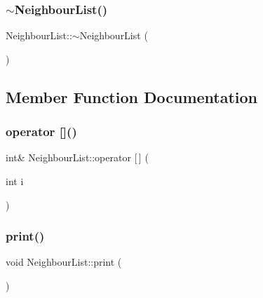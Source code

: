 \mbox{\label{struct_neighbour_list_afcdbcc7fde83d4ce3a4fecc8d4105cd8}} 
\subsubsection{\texorpdfstring{$\sim$NeighbourList()}{~NeighbourList()}}
{\footnotesize\ttfamily Neighbour\+List\+::$\sim$\+Neighbour\+List (\begin{DoxyParamCaption}{ }\end{DoxyParamCaption})}



\subsection{Member Function Documentation}
\mbox{\label{struct_neighbour_list_a9bd6ad04ef1eb6ad9737ac493b6864d1}} 
\subsubsection{\texorpdfstring{operator []()}{operator []()}}
{\footnotesize\ttfamily int\& Neighbour\+List\+::operator \mbox{[}$\,$\mbox{]} (\begin{DoxyParamCaption}\item[{int}]{i }\end{DoxyParamCaption})\hspace{0.3cm}{\ttfamily [inline]}}

\mbox{\label{struct_neighbour_list_a9e8123deded59c4c702429fda52af140}} 
\subsubsection{\texorpdfstring{print()}{print()}}
{\footnotesize\ttfamily void Neighbour\+List\+::print (\begin{DoxyParamCaption}{ }\end{DoxyParamCaption})}



